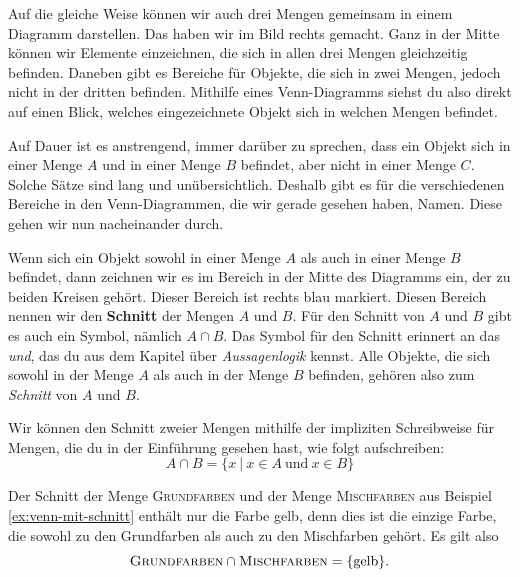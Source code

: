 \documentclass[../../main.tex]{subfiles}
\begin{document}
Auf die gleiche Weise können wir auch drei Mengen gemeinsam in einem Diagramm darstellen. Das haben wir im Bild rechts gemacht. Ganz in der Mitte können wir Elemente einzeichnen, die sich in allen drei Mengen gleichzeitig befinden. Daneben gibt es Bereiche für Objekte, die sich in zwei Mengen, jedoch nicht in der dritten befinden. Mithilfe eines Venn-Diagramms siehst du also direkt auf einen Blick, welches eingezeichnete Objekt sich in welchen Mengen befindet.

Auf Dauer ist es anstrengend, immer darüber zu sprechen, dass ein Objekt sich in einer Menge $A$ und in einer Menge $B$ befindet, aber nicht in einer Menge $C$. Solche Sätze sind lang und unübersichtlich. Deshalb gibt es für die verschiedenen Bereiche in den Venn-Diagrammen, die wir gerade gesehen haben, Namen. Diese gehen wir nun nacheinander durch.

Wenn sich ein Objekt sowohl in einer Menge $A$ als auch in einer Menge $B$ befindet, dann zeichnen wir es im Bereich in der Mitte des Diagramms ein, der zu beiden Kreisen gehört. Dieser Bereich ist rechts blau markiert. Diesen Bereich nennen wir den \textbf{Schnitt} der Mengen $A$ und $B$. Für den Schnitt von $A$ und $B$ gibt es auch ein Symbol, nämlich $A\cap B$. Das Symbol für den Schnitt erinnert an das \emph{und}, das du aus dem Kapitel über \emph{Aussagenlogik} kennst. Alle Objekte, die sich sowohl in der Menge $A$ als auch in der Menge $B$ befinden, gehören also zum \emph{Schnitt} von $A$ und $B$.

Wir können den Schnitt zweier Mengen mithilfe der impliziten Schreibweise für Mengen, die du in der Einführung gesehen hast, wie folgt aufschreiben:
\[A\cap B=\{x~|~x\in A~\text{und}~x\in B\}\]
\begin{example}{}
    Der Schnitt der Menge \textsc{Grundfarben} und der Menge \textsc{Mischfarben} aus Beispiel \ref{ex:venn-mit-schnitt} enthält nur die Farbe gelb, denn dies ist die einzige Farbe, die sowohl zu den Grundfarben als auch zu den Mischfarben gehört. Es gilt also
    \[\textsc{Grundfarben}\cap\textsc{Mischfarben}=\{\text{gelb}\}.\]
\end{example}
\end{document}
